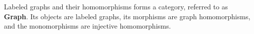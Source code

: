 \begin{example}
    Labeled graphs and their homomorphisms forms a category, referred to as \textbf{Graph}. Its objects are labeled graphs, its morphisms are graph homomorphisms, and the monomorphisms are injective homomorphisms.
\end{example}
